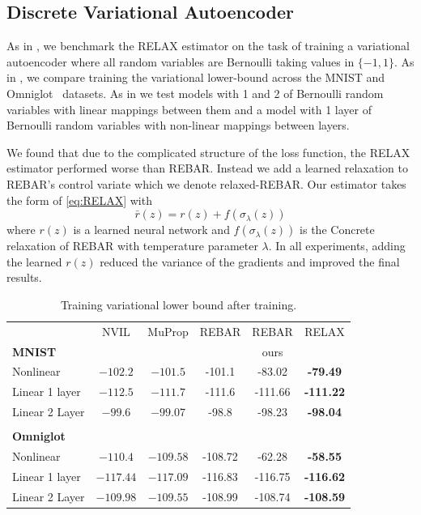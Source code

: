 \documentclass{article}
\newcommand{\relaxed}{r}
\begin{document}
\subsection{Discrete Variational Autoencoder}
As in \citep{tucker2017rebar}, we benchmark the RELAX estimator on the task of training a variational autoencoder \citep{kingma2013autoencoding, rezende2014stochastic} where all random variables are Bernoulli taking values in $\{-1, 1\}$.
As in \cite{tucker2017rebar}, we compare training the variational lower-bound across the MNIST and Omniglot~\citep{lake2015human} datasets.
As in \cite{tucker2017rebar} we test models with 1 and 2 of Bernoulli random variables with linear mappings between them and a model with 1 layer of Bernoulli random variables with non-linear mappings between layers.

We found that due to the complicated structure of the loss function, the RELAX estimator performed worse than REBAR. Instead we add a learned relaxation to REBAR's control variate which we denote relaxed-REBAR.
Our estimator takes the form of \eqref{eq:RELAX} with $$\bar \relaxed(z) = \relaxed(z) + f(\sigma_\lambda(z))$$ where $\relaxed(z)$ is a learned neural network and $f(\sigma_\lambda(z))$ is the Concrete relaxation of REBAR with temperature parameter $\lambda$.
In all experiments, adding the learned $\relaxed(z)$ reduced the variance of the gradients and improved the final results. 

\begin{table}[h]
\begin{center}
\begin{tabular}{l c c c c c} 
& NVIL & MuProp & REBAR & REBAR & RELAX \\
\textbf{MNIST} & & & \citet{tucker2017rebar} & ours & \\\midrule
Nonlinear      & $-102.2$ & $-101.5$ & -101.1  &  -83.02 &  \textbf{-79.49} \\
Linear 1 layer  & $-112.5$ & $-111.7$ & -111.6 & -111.66 & \textbf{-111.22} \\ 
Linear 2 Layer  & $-99.6$ & $-99.07$ & -98.8  & -98.23 & \textbf{-98.04} \\\\
\textbf{Omniglot}\\ \midrule
Nonlinear      & $-110.4$  & $-109.58$ & -108.72  & -62.28 & \textbf{-58.55} \\
Linear 1 layer & $-117.44$ & $-117.09$ & -116.83  & -116.75 & \textbf{-116.62} \\ 
Linear 2 Layer & $-109.98$ & $-109.55$ & -108.99  & -108.74 & \textbf{-108.59}
\end{tabular}
\end{center}
\label{tab:vae}
\caption{Training variational lower bound after training.}
\end{table}
\end{document}
